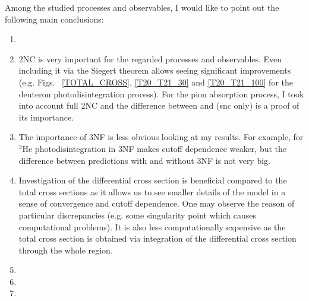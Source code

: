 Among the studied processes and observables, I would like to point out the following 
main conclusions:

\begin{enumerate}
    \item {}
    \item 2NC is very important for the regarded processes and observables. Even including it via the Siegert theorem allows seeing significant improvements (e.g. Figs.~ \ref{TOTAL_CROSS}, \ref{T20_T21_30} and \ref{T20_T21_100} for the deuteron photodisintegration process). For the pion absorption process, I took into account full 2NC and the difference between  and  (\gls{snc} only) is a proof of its importance.
    \item The importance of 3NF is less obvious looking at my results. For example, for $^3$He photodisintegration in  3NF makes cutoff dependence weaker, but the difference between predictions with and without 3NF is not very big.
    \item Investigation of the differential cross section is beneficial compared to the total cross sections as it allows us to see smaller details of the model in a sense of convergence and cutoff dependence. One may observe the reason of particular discrepancies (e.g. some singularity point which causes computational problems). It is also less computationally expensive as the total cross section is obtained via integration of the differential cross section through the whole region.
    \item {}
    \item {}
    \item {}
\end{enumerate}

